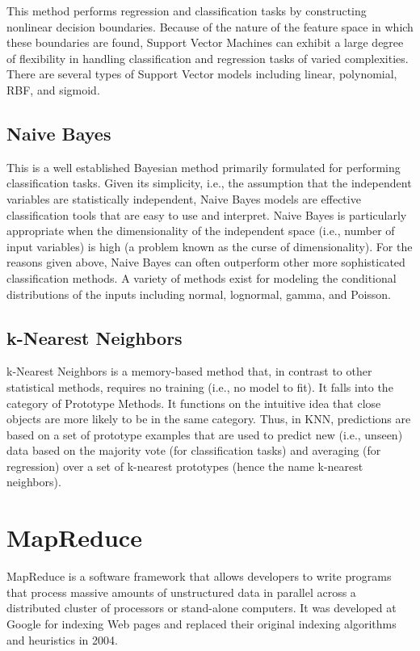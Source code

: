 \documentclass[11pt]{article} %
\begin{document}
This method performs regression and classification tasks by constructing nonlinear decision boundaries. Because of the nature of the feature space in which these boundaries are found, Support Vector Machines can exhibit a large degree of flexibility in handling classification and regression tasks of varied complexities. There are several types of Support Vector models including linear, polynomial, RBF, and sigmoid.



\subsection{Naive Bayes}

This is a well established Bayesian method primarily formulated for performing classification tasks. Given its simplicity, i.e., the assumption that the independent variables are statistically independent, Naive Bayes models are effective classification tools that are easy to use and interpret. Naive Bayes is particularly appropriate when the dimensionality of the independent space (i.e., number of input variables) is high (a problem known as the curse of dimensionality). For the reasons given above, Naive Bayes can often outperform other more sophisticated classification methods. A variety of methods exist for modeling the conditional distributions of the inputs including normal, lognormal, gamma, and Poisson.



\subsection{k-Nearest Neighbors}

k-Nearest Neighbors is a memory-based method that, in contrast to other statistical methods, requires no training (i.e., no model to fit). It falls into the category of Prototype Methods. It functions on the intuitive idea that close objects are more likely to be in the same category. Thus, in KNN, predictions are based on a set of prototype examples that are used to predict new (i.e., unseen) data based on the majority vote (for classification tasks) and averaging (for regression) over a set of k-nearest prototypes (hence the name k-nearest neighbors).


\newpage

\newpage
\section{MapReduce}
MapReduce is a software framework that allows developers to write programs that process massive amounts of unstructured data in parallel across a distributed cluster of processors or stand-alone computers. It was developed at Google for indexing Web pages and replaced their original indexing algorithms and heuristics in 2004.
\end{document}
